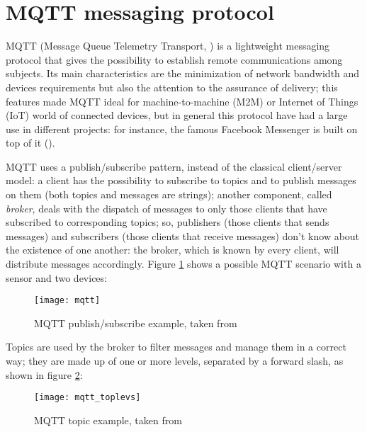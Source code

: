 \section{MQTT messaging protocol}\label{mqtt}

MQTT (Message Queue Telemetry Transport, \cite{banks2014mqtt}) is a lightweight messaging protocol that gives the possibility to establish remote communications among subjects. Its main characteristics are the minimization of network bandwidth and devices requirements but also the attention to the assurance of delivery; this features made MQTT ideal for machine-to-machine (M2M) or Internet of Things (IoT) world of connected devices, but in general this protocol have had a large use in different projects: for instance, the famous Facebook Messenger is built on top of it (\cite{zhang2011building}).

MQTT uses a publish\slash{}subscribe pattern, instead of the classical client\slash{}server model: a client has the possibility to subscribe to topics and to publish messages on them (both topics and messages are strings); another component, called \textit{broker}, deals with the dispatch of messages to only those clients that have subscribed to corresponding topics; so, publishers (those clients that sends messages) and subscribers (those clients that receive messages) don't know about the existence of one another: the broker, which is known by every client, will distribute messages accordingly. Figure \ref{fig::mqtt_example} shows a possible MQTT scenario with a sensor and two devices:

\begin{figure}[H]

    \centering
    \texttt{[image: mqtt]}
    \caption{MQTT publish/subscribe example, taken from \cite{site:hivemq}}
    \label{fig::mqtt_example}

\end{figure}

Topics are used by the broker to filter messages and manage them in a correct way; they are made up of one or more levels, separated by a forward slash, as shown in figure \ref{fig::topic}:

\begin{figure}[H]

    \centering
    \texttt{[image: mqtt\_toplevs]}
    \caption{MQTT topic example, taken from \cite{site:hivemq}}
    \label{fig::topic}

\end{figure}

